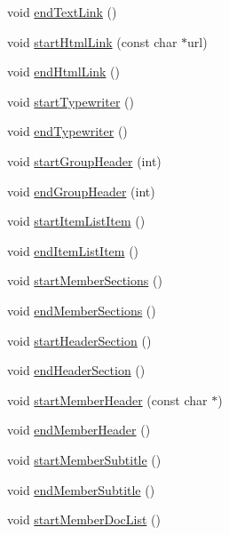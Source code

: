 \begin{DoxyCompactItemize}
\item 
void \hyperlink{class_html_generator_ab2b0bff4d5587ad095832783fdba8064}{end\+Text\+Link} ()
\item 
void \hyperlink{class_html_generator_a5fdd7ff7fcabd4e301b8fec2b9c72b85}{start\+Html\+Link} (const char $\ast$url)
\item 
void \hyperlink{class_html_generator_af6ca967739e45755318c78058115c27a}{end\+Html\+Link} ()
\item 
void \hyperlink{class_html_generator_ae3174a7318289e8f7042f2d10345c419}{start\+Typewriter} ()
\item 
void \hyperlink{class_html_generator_a574b29296b93ffa4c3b119cbee70269c}{end\+Typewriter} ()
\item 
void \hyperlink{class_html_generator_a1368991b5988b527dc0c5b0b05cbb5b1}{start\+Group\+Header} (int)
\item 
void \hyperlink{class_html_generator_abfe85b944b5ebe2ca5455d44ea755c8d}{end\+Group\+Header} (int)
\item 
void \hyperlink{class_html_generator_aaa5091e04c77ea310e0c5dee4cc04e94}{start\+Item\+List\+Item} ()
\item 
void \hyperlink{class_html_generator_a91f6100cb025e52c1cef35b8749761b2}{end\+Item\+List\+Item} ()
\item 
void \hyperlink{class_html_generator_ab81f4238abee6baf6234c1a94a03df18}{start\+Member\+Sections} ()
\item 
void \hyperlink{class_html_generator_a60d8489e48efdf2a04d56ff3fcadbe1c}{end\+Member\+Sections} ()
\item 
void \hyperlink{class_html_generator_a966c1d75a00ae4494356fd94b2d2c1bf}{start\+Header\+Section} ()
\item 
void \hyperlink{class_html_generator_a164f820134d45aaac56a60fe05b62963}{end\+Header\+Section} ()
\item 
void \hyperlink{class_html_generator_a247480c65e9a473c4f82533ac4f2a8aa}{start\+Member\+Header} (const char $\ast$)
\item 
void \hyperlink{class_html_generator_a9188640d2baf3775008ebcde5d94873d}{end\+Member\+Header} ()
\item 
void \hyperlink{class_html_generator_a71af5b3b4b0ffb7f7f664a7d8205547d}{start\+Member\+Subtitle} ()
\item 
void \hyperlink{class_html_generator_a3f449b4e7f55848442238528a7c19931}{end\+Member\+Subtitle} ()
\item 
void \hyperlink{class_html_generator_a1d6acde43c3f5608a64cc8f3ec90738d}{start\+Member\+Doc\+List} ()

\end{DoxyCompactItemize}
